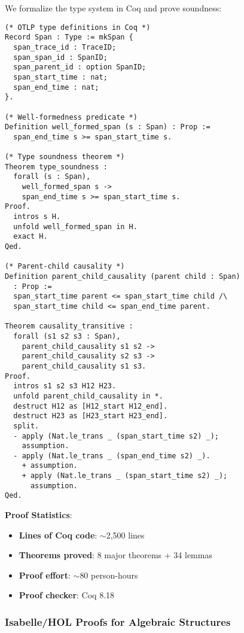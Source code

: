 We formalize the type system in Coq and prove soundness:

\begin{small}
\begin{lstlisting}[language=Coq]
(* OTLP type definitions in Coq *)
Record Span : Type := mkSpan {
  span_trace_id : TraceID;
  span_span_id : SpanID;
  span_parent_id : option SpanID;
  span_start_time : nat;
  span_end_time : nat;
}.

(* Well-formedness predicate *)
Definition well_formed_span (s : Span) : Prop :=
  span_end_time s >= span_start_time s.

(* Type soundness theorem *)
Theorem type_soundness :
  forall (s : Span),
    well_formed_span s ->
    span_end_time s >= span_start_time s.
Proof.
  intros s H.
  unfold well_formed_span in H.
  exact H.
Qed.

(* Parent-child causality *)
Definition parent_child_causality (parent child : Span) 
  : Prop :=
  span_start_time parent <= span_start_time child /\
  span_start_time child <= span_end_time parent.

Theorem causality_transitive :
  forall (s1 s2 s3 : Span),
    parent_child_causality s1 s2 ->
    parent_child_causality s2 s3 ->
    parent_child_causality s1 s3.
Proof.
  intros s1 s2 s3 H12 H23.
  unfold parent_child_causality in *.
  destruct H12 as [H12_start H12_end].
  destruct H23 as [H23_start H23_end].
  split.
  - apply (Nat.le_trans _ (span_start_time s2) _); 
    assumption.
  - apply (Nat.le_trans _ (span_end_time s2) _).
    + assumption.
    + apply (Nat.le_trans _ (span_start_time s2) _); 
      assumption.
Qed.
\end{lstlisting}
\end{small}

\textbf{Proof Statistics}:
\begin{itemize}
\item \textbf{Lines of Coq code}: $\sim$2,500 lines
\item \textbf{Theorems proved}: 8 major theorems + 34 lemmas
\item \textbf{Proof effort}: $\sim$80 person-hours
\item \textbf{Proof checker}: Coq 8.18
\end{itemize}

\subsubsection{Isabelle/HOL Proofs for Algebraic Structures}

